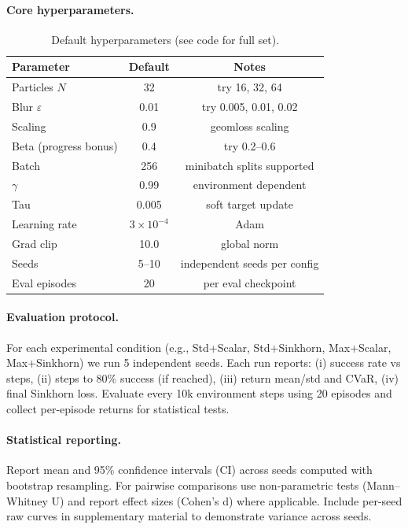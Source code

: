 \documentclass{article}
\begin{document}
\paragraph{Core hyperparameters.}
\begin{table}[h!]
\centering
\begin{tabular}{lcc}
\toprule
Parameter & Default & Notes \\
\midrule
Particles $N$ & 32 & try 16, 32, 64 \\
Blur $\varepsilon$ & 0.01 & try 0.005, 0.01, 0.02 \\
Scaling & 0.9 & geomloss scaling \\
Beta (progress bonus) & 0.4 & try 0.2–0.6 \\
Batch & 256 & minibatch splits supported \\
$\gamma$ & 0.99 & environment dependent \\
Tau & 0.005 & soft target update \\
Learning rate & $3\times10^{-4}$ & Adam \\
Grad clip & 10.0 & global norm \\
Seeds & 5--10 & independent seeds per config \\
Eval episodes & 20 & per eval checkpoint \\
\bottomrule
\end{tabular}
\caption{Default hyperparameters (see code for full set).}
\end{table}

\paragraph{Evaluation protocol.} For each experimental condition (e.g., Std+Scalar, Std+Sinkhorn, Max+Scalar, Max+Sinkhorn) we run 5 independent seeds. Each run reports: (i) success rate vs steps, (ii) steps to 80\% success (if reached), (iii) return mean/std and CVaR, (iv) final Sinkhorn loss. Evaluate every 10k environment steps using 20 episodes and collect per-episode returns for statistical tests.

\paragraph{Statistical reporting.} Report mean and 95\% confidence intervals (CI) across seeds computed with bootstrap resampling. For pairwise comparisons use non-parametric tests (Mann–Whitney U) and report effect sizes (Cohen's d) where applicable. Include per-seed raw curves in supplementary material to demonstrate variance across seeds.
\end{document}
